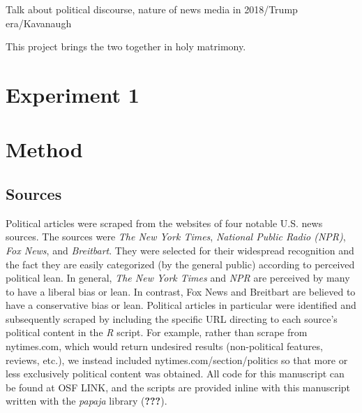 \documentclass[,man]{apa6}
\theoremstyle{definition}
\theoremstyle{definition}
\theoremstyle{definition}
\theoremstyle{remark}
\begin{document}
Talk about political discourse, nature of news media in 2018/Trump
era/Kavanaugh

This project brings the two together in holy matrimony.

\hypertarget{experiment-1}{%
\section{Experiment 1}\label{experiment-1}}

\hypertarget{method}{%
\section{Method}\label{method}}

\hypertarget{sources}{%
\subsection{Sources}\label{sources}}

Political articles were scraped from the websites of four notable U.S.
news sources. The sources were \emph{The New York Times}, \emph{National
Public Radio (NPR)}, \emph{Fox News}, and \emph{Breitbart}. They were
selected for their widespread recognition and the fact they are easily
categorized (by the general public) according to perceived political
lean. In general, \emph{The New York Times} and \emph{NPR} are perceived
by many to have a liberal bias or lean. In contrast, Fox News and
Breitbart are believed to have a conservative bias or lean. Political
articles in particular were identified and subsequently scraped by
including the specific URL directing to each source's political content
in the \emph{R} script. For example, rather than scrape from
nytimes.com, which would return undesired results (non-political
features, reviews, etc.), we instead included
nytimes.com/section/politics so that more or less exclusively political
content was obtained. All code for this manuscript can be found at OSF
LINK, and the scripts are provided inline with this manuscript written
with the \emph{papaja} library ({\textbf{???}}).
\end{document}
